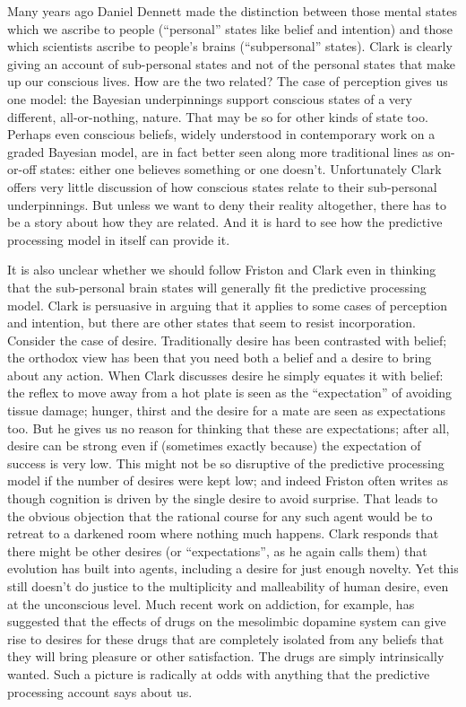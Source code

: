 Many years ago Daniel Dennett made the distinction between those mental states which we ascribe to people (``personal'' states like belief and intention) and those which scientists ascribe to people's brains (``subpersonal'' states). Clark is clearly giving an account of sub-personal states and not of the personal states that make up our conscious lives. How are the two related? The case of perception gives us one model: the Bayesian underpinnings support conscious states of a very different, all-or-nothing, nature. That may be so for other kinds of state too. Perhaps even conscious beliefs, widely understood in contemporary work on a graded Bayesian model, are in fact better seen along more traditional lines as on-or-off states: either one believes something or one doesn't. Unfortunately Clark offers very little discussion of how conscious states relate to their sub-personal underpinnings. But unless we want to deny their reality altogether, there has to be a story about how they are related. And it is hard to see how the predictive processing model in itself can provide it.

It is also unclear whether we should follow Friston and Clark even in thinking that the sub-personal brain states will generally fit the predictive processing model. Clark is persuasive in arguing that it applies to some cases of perception and intention, but there are other states that seem to resist incorporation. Consider the case of desire. Traditionally desire has been contrasted with belief; the orthodox view has been that you need both a belief and a desire to bring about any action. When Clark discusses desire he simply equates it with belief: the reflex to move away from a hot plate is seen as the ``expectation'' of avoiding tissue damage; hunger, thirst and the desire for a mate are seen as expectations too. But he gives us no reason for thinking that these are expectations; after all, desire can be strong even if (sometimes exactly because) the expectation of success is very low. This might not be so disruptive of the predictive processing model if the number of desires were kept low; and indeed Friston often writes as though cognition is driven by the single desire to avoid surprise. That leads to the obvious objection that the rational course for any such agent would be to retreat to a darkened room where nothing much happens. Clark responds that there might be other desires (or ``expectations'', as he again calls them) that evolution has built into agents, including a desire for just enough novelty. Yet this still doesn't do justice to the multiplicity and malleability of human desire, even at the unconscious level. Much recent work on addiction, for example, has suggested that the effects of drugs on the mesolimbic dopamine system can give rise to desires for these drugs that are completely isolated from any beliefs that they will bring pleasure or other satisfaction. The drugs are simply intrinsically wanted. Such a picture is radically at odds with anything that the predictive processing account says about us.

